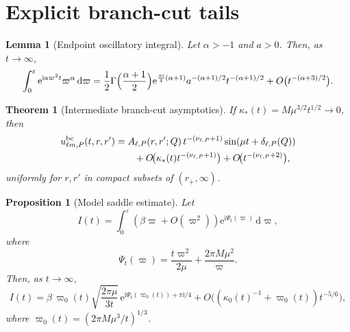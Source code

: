 \documentclass[10pt,a4paper]{amsart}
\newtheorem{theorem}{Theorem}
\newtheorem{proposition}{Proposition}
\newtheorem{lemma}{Lemma}
\newcommand{\bc}{\mathrm{bc}}
\newcommand{\dd}{\mathrm d}
\newcommand{\ee}{\mathrm e}
\newcommand{\eps}{\varepsilon}
\newcommand{\ii}{\mathrm i}
\newcommand{\kap}{\kappa}
\newcommand{\vp}{\varpi}
\begin{document}
\section{Explicit branch-cut tails}\label{sec:threshold_to_time}

\begin{lemma}[Endpoint oscillatory integral]\label{lem:endpoint_integral}
Let $\alpha>-1$ and $a>0$.  Then, as $t\to\infty$,
\begin{equation}\label{eq:endpoint_integral}
   \int_0^\eps\ee^{\ii a\vp^2 t}\vp^\alpha\,\dd\vp
   =
   \frac12
   \Gamma\Bigl(\frac{\alpha+1}{2}\Bigr)
   \ee^{\frac{\pi\ii}{4}(\alpha+1)}
   a^{-(\alpha+1)/2}
   t^{-(\alpha+1)/2}
   +O\bigl(t^{-(\alpha+3)/2}\bigr).
\end{equation}
\end{lemma}

\begin{theorem}[Intermediate branch-cut asymptotics]\label{thm:intermediate}
If $\kap_*(t)=M\mu^{3/2}t^{1/2}\to0$, then
\begin{align}\label{eq:intermediate_explicit}
   u_{\ell m,P}^{\bc}(t,r,r')
   &=
   A_{\ell,P}(r,r';Q)\,t^{-(\nu_{\ell,P}+1)}
   \sin(\mu t+\delta_{\ell,P}(Q))
   \notag\\
   &\qquad
   +O\!\bigl(\kap_*(t)t^{-(\nu_{\ell,P}+1)}\bigr)
   +O\!\bigl(t^{-(\nu_{\ell,P}+2)}\bigr),
\end{align}
uniformly for $r,r'$ in compact subsets of $(r_+,\infty)$.
\end{theorem}

\begin{proposition}[Model saddle estimate]\label{prop:saddle_estimate}
Let
\begin{equation}\label{eq:generic_saddle_integral}
   I(t)=\int_0^\eps(\beta\vp+O(\vp^2))\ee^{\ii\Psi_t(\vp)}\,\dd\vp,
\end{equation}
where
\begin{equation}\label{eq:phase_function}
   \Psi_t(\vp)=\frac{t\vp^2}{2\mu}+\frac{2\pi M\mu^2}{\vp}.
\end{equation}
Then, as $t\to\infty$,
\begin{equation}\label{eq:saddle_estimate}
   I(t)
   =
   \beta\,\vp_0(t)\sqrt{\frac{2\pi\mu}{3t}}\,
   \ee^{\ii\Psi_t(\vp_0(t))+\pi\ii/4}
   +
   O\!\bigl((\kap_0(t)^{-1}+\vp_0(t))t^{-5/6}\bigr),
\end{equation}
where $\vp_0(t)=(2\pi M\mu^3/t)^{1/3}$.
\end{proposition}
\end{document}
